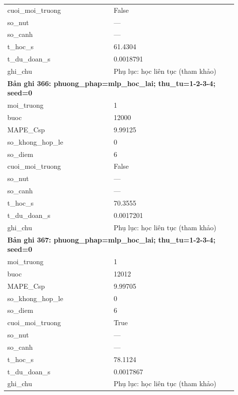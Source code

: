 \begin{longtable}{p{0.43\linewidth}p{0.50\linewidth}}
cuoi\_\allowbreak moi\_\allowbreak truong & False \\
so\_\allowbreak nut & — \\
so\_\allowbreak canh & — \\
t\_\allowbreak hoc\_\allowbreak s & 61.4304 \\
t\_\allowbreak du\_\allowbreak doan\_\allowbreak s & 0.0018791 \\
ghi\_\allowbreak chu & Phụ lục: học liên tục (tham khảo) \\
\midrule
\multicolumn{2}{p{0.95\linewidth}}{\textbf{Bản ghi 366: phuong\_phap=mlp\_hoc\_lai; thu\_tu=1-2-3-4; seed=0}} \\
moi\_\allowbreak truong & 1 \\
buoc & 12000 \\
MAPE\_\allowbreak Csp & 9.99125 \\
so\_\allowbreak khong\_\allowbreak hop\_\allowbreak le & 0 \\
so\_\allowbreak diem & 6 \\
cuoi\_\allowbreak moi\_\allowbreak truong & False \\
so\_\allowbreak nut & — \\
so\_\allowbreak canh & — \\
t\_\allowbreak hoc\_\allowbreak s & 70.3555 \\
t\_\allowbreak du\_\allowbreak doan\_\allowbreak s & 0.0017201 \\
ghi\_\allowbreak chu & Phụ lục: học liên tục (tham khảo) \\
\midrule
\multicolumn{2}{p{0.95\linewidth}}{\textbf{Bản ghi 367: phuong\_phap=mlp\_hoc\_lai; thu\_tu=1-2-3-4; seed=0}} \\
moi\_\allowbreak truong & 1 \\
buoc & 12012 \\
MAPE\_\allowbreak Csp & 9.99705 \\
so\_\allowbreak khong\_\allowbreak hop\_\allowbreak le & 0 \\
so\_\allowbreak diem & 6 \\
cuoi\_\allowbreak moi\_\allowbreak truong & True \\
so\_\allowbreak nut & — \\
so\_\allowbreak canh & — \\
t\_\allowbreak hoc\_\allowbreak s & 78.1124 \\
t\_\allowbreak du\_\allowbreak doan\_\allowbreak s & 0.0017867 \\
ghi\_\allowbreak chu & Phụ lục: học liên tục (tham khảo) \\

\end{longtable}
